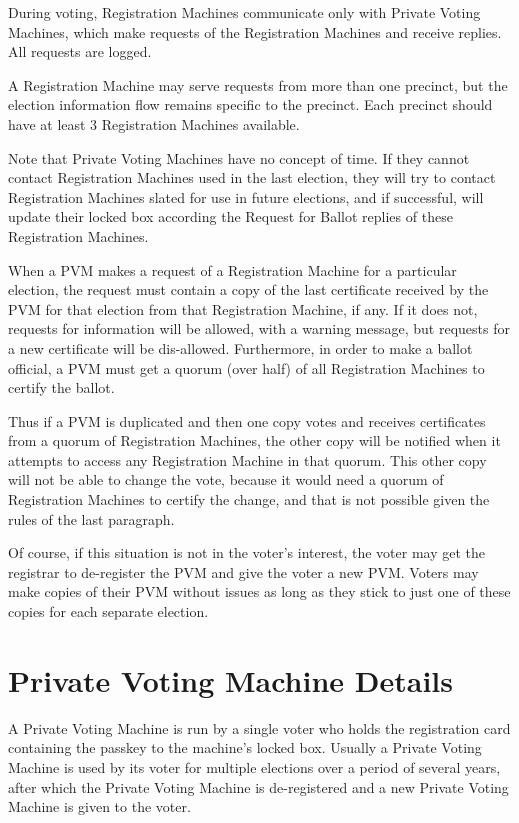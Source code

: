 \documentclass[12pt]{article}
\begin{document}
During voting, Registration Machines communicate only with
Private Voting Machines, which make requests of the Registration
Machines and receive replies.  All requests are logged.

A Registration Machine may serve requests from more than
one precinct, but the election information flow remains specific
to the precinct.  Each precinct should have at least 3
Registration Machines available.

Note that Private Voting Machines have no concept of time.
If they cannot contact Registration Machines used in the last
election, they will try to contact Registration Machines
slated for use in future elections, and if successful, will
update their locked box according the Request for Ballot
replies of these Registration Machines.

When a PVM makes a request of a Registration Machine for
a particular election, the request must contain a copy of
the last certificate received by the PVM for that election
from that Registration Machine, if any.  If it does not,
requests for information will be allowed, with a warning
message, but requests for a new certificate will be dis-allowed.
Furthermore, in order to make a ballot official, a PVM must
get a quorum (over half) of all Registration Machines to certify
the ballot.

Thus if a PVM is duplicated and then one copy votes and receives certificates
from a quorum of Registration Machines,
the other copy will be notified when it attempts to access any
Registration Machine in that quorum.
This other copy will not be able to change the vote, because
it would need a quorum of Registration Machines to certify the
change, and that is not possible given the rules of the last paragraph.

Of course,
if this situation is not in the voter's interest, the voter
may get the registrar to de-register the PVM and give the voter
a new PVM.  Voters may make copies of their PVM without issues
as long as they stick to just one of these copies for each
separate election.

\section{Private Voting Machine Details}

A Private Voting Machine is run by a single voter
who holds the registration card containing the passkey to
the machine's locked box.  Usually a Private Voting Machine
is used by its voter for multiple elections over a period
of several years, after which the Private Voting Machine
is de-registered and a new Private Voting Machine
is given to the voter.
\end{document}
